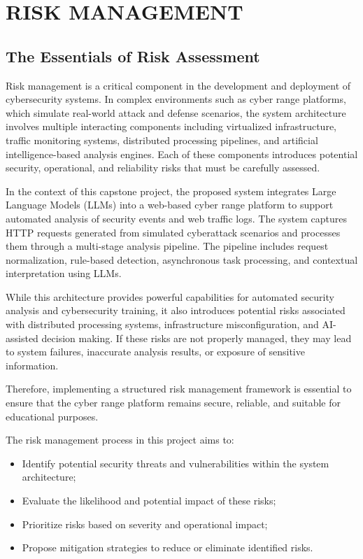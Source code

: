\chapter{RISK MANAGEMENT}

\section{The Essentials of Risk Assessment}
Risk management is a critical component in the development and deployment of cybersecurity systems. In complex environments such as cyber range platforms, which simulate real-world attack and defense scenarios, the system architecture involves multiple interacting components including virtualized infrastructure, traffic monitoring systems, distributed processing pipelines, and artificial intelligence-based analysis engines. Each of these components introduces potential security, operational, and reliability risks that must be carefully assessed.

In the context of this capstone project, the proposed system integrates Large Language Models (LLMs) into a web-based cyber range platform to support automated analysis of security events and web traffic logs. The system captures HTTP requests generated from simulated cyberattack scenarios and processes them through a multi-stage analysis pipeline. The pipeline includes request normalization, rule-based detection, asynchronous task processing, and contextual interpretation using LLMs.

While this architecture provides powerful capabilities for automated security analysis and cybersecurity training, it also introduces potential risks associated with distributed processing systems, infrastructure misconfiguration, and AI-assisted decision making. If these risks are not properly managed, they may lead to system failures, inaccurate analysis results, or exposure of sensitive information.

Therefore, implementing a structured risk management framework is essential to ensure that the cyber range platform remains secure, reliable, and suitable for educational purposes.

The risk management process in this project aims to:
\begin{itemize}
    \item Identify potential security threats and vulnerabilities within the system architecture;
    \item Evaluate the likelihood and potential impact of these risks;
    \item Prioritize risks based on severity and operational impact;
    \item Propose mitigation strategies to reduce or eliminate identified risks.
\end{itemize}

